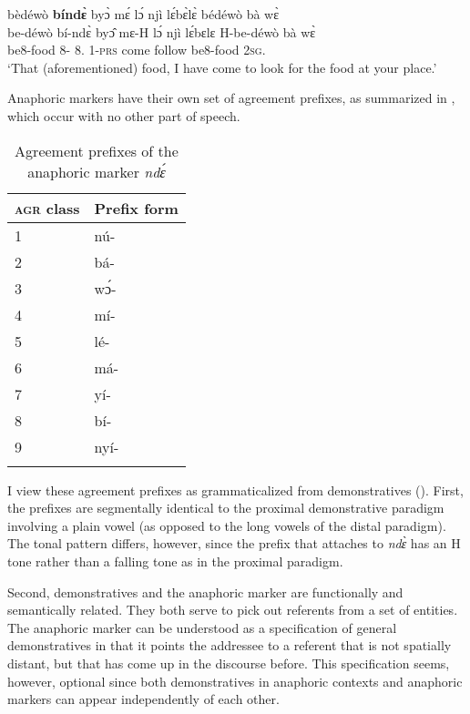 \ea \label{41t}
  \glll bèdéwò {\bfseries bíndɛ̀} byɔ̀ mɛ́ lɔ́ njì lɛ́bɛ̀lɛ̀ bédéwò bà wɛ̀\\
        be-déwò bí-ndɛ̀ byɔ̂ mɛ-H lɔ́ njì lɛ́bɛlɛ H-be-déwò bà wɛ̀ \\
           be8-food 8-{\ANA} 8.{\OBJ} 1-\textsc{prs} {\RETRO} come  follow be8-food {\AP} 2\textsc{sg}.{\OBJ}  \\
    \trans `That (aforementioned) food, I have come to look for the food at your place.'
\z


Anaphoric markers have their own set of agreement prefixes, as summarized in , which occur with no other part of speech. 

\begin{table}
\begin{tabularx}{.5\textwidth}{Xl}
 \lsptoprule
\textsc{agr} class & Prefix form \\
  \midrule
 1 & nú-  \\
 2 & bá- \\
 3 & wɔ́- \\
4 & mí- \\
5 & lé- \\
6 & má- \\
7 & yí- \\
8 & bí- \\
9 & nyí- \\
  \lspbottomrule
\end{tabularx}
\caption{Agreement prefixes of the anaphoric marker {\itshape ndɛ́}} 
\label{Tab:ANA}
\end{table}

\noindent %
I view these agreement prefixes as grammaticalized from demonstratives (). First, the prefixes are segmentally identical to the proximal demonstrative paradigm involving a plain vowel (as opposed to the long vowels of the distal paradigm). The tonal pattern differs, however, since the prefix that attaches to {\itshape ndɛ̀} has an H tone rather than a falling tone as in the proximal paradigm. 

Second, demonstratives and the anaphoric marker are functionally and semantically related. They both serve to pick out referents from a set of entities. The anaphoric marker can be understood as a specification of general demonstratives in that it points the addressee to a referent that is not spatially distant, but that has come up in the discourse before. This specification seems, however, optional since both demonstratives in anaphoric contexts and anaphoric markers can appear independently of each other.



